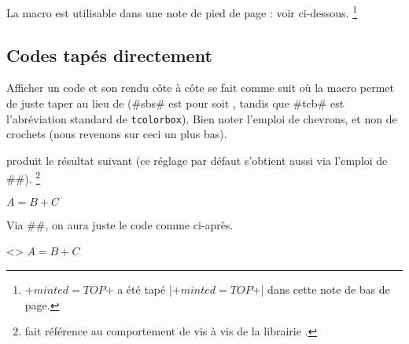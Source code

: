 \documentclass{tutodoc}
\begin{document}
\begin{tdocnote}
    La macro  est utilisable dans une note de pied de page : voir ci-dessous.%
    \footnote{
        \tdoclatexin+$minted = TOP$+ a été tapé \tdoclatexin|\tdoclatexin+$minted = TOP$+| dans cette note de bas de page.
    }
\end{tdocnote}



\subsection{Codes tapés directement}

\begin{tdocexa}
    Afficher un code et son rendu côte à côte se fait comme suit où la macro  permet de juste taper  au lieu de  (\tdoclatexin#sbs# est pour  soit , tandis que \tdoclatexin#tcb# est l'abréviation standard de \texttt{tcolorbox}). Bien noter l'emploi de chevrons, et non de crochets (nous revenons sur ceci un plus bas).

\end{tdocexa}


\begin{tdocexa}[À la suite]
     produit le résultat suivant (ce réglage par défaut s'obtient aussi via l'emploi de \tdoclatexin##).%
    \footnote{
         fait référence au comportement  de  vis à vis de la librairie .
    }

    \begin{tdoclatex}
$A = B + C$
    \end{tdoclatex}
\end{tdocexa}


\begin{tdocexa}
    Via \tdoclatexin##, on aura juste le code comme ci-après.

    \begin{tdoclatex}<>
$A = B + C$
    \end{tdoclatex}
\end{tdocexa}
\end{document}
